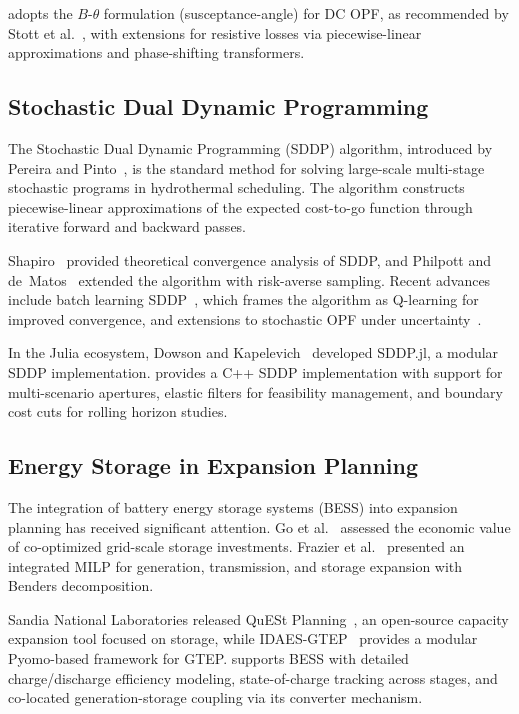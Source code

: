 \gtopt{} adopts the $B$-$\theta$ formulation (susceptance-angle) for
DC OPF, as recommended by Stott et al.~\cite{stott2009dc_opf}, with
extensions for resistive losses via piecewise-linear approximations and
phase-shifting transformers.

\subsection{Stochastic Dual Dynamic Programming}

The Stochastic Dual Dynamic Programming (SDDP) algorithm, introduced by
Pereira and Pinto~\cite{pereira1991sddp}, is the standard method for
solving large-scale multi-stage stochastic programs in hydrothermal
scheduling.  The algorithm constructs piecewise-linear approximations of
the expected cost-to-go function through iterative forward and backward
passes.

Shapiro~\cite{shapiro2011sddp_analysis} provided theoretical convergence
analysis of SDDP, and Philpott and de~Matos~\cite{philpott2013sddp_convergence}
extended the algorithm with risk-averse sampling.  Recent advances include
batch learning SDDP~\cite{leclercq2023batch_sddp}, which frames the
algorithm as Q-learning for improved convergence, and extensions to
stochastic OPF under uncertainty~\cite{fletcher2024sddp_opf}.

In the Julia ecosystem, Dowson and Kapelevich~\cite{dowson2020sddp_jl}
developed SDDP.jl, a modular SDDP implementation.  \gtopt{} provides a
C++ SDDP implementation with support for multi-scenario apertures, elastic
filters for feasibility management, and boundary cost cuts for rolling
horizon studies.

\subsection{Energy Storage in Expansion Planning}

The integration of battery energy storage systems (BESS) into expansion
planning has received significant attention.  Go et al.~\cite{Go2016ess_expansion}
assessed the economic value of co-optimized grid-scale storage investments.
Frazier et al.~\cite{frazier2023bess_milp} presented an integrated MILP
for generation, transmission, and storage expansion with Benders
decomposition.

Sandia National Laboratories released QuESt Planning~\cite{sandia2024quest},
an open-source capacity expansion tool focused on storage, while
IDAES-GTEP~\cite{idaes_gtep2024} provides a modular Pyomo-based framework
for GTEP.  \gtopt{} supports BESS with detailed charge/discharge efficiency
modeling, state-of-charge tracking across stages, and co-located
generation-storage coupling via its converter mechanism.

